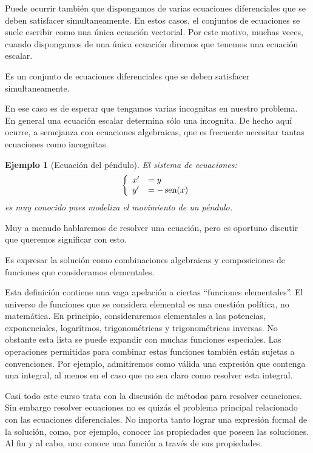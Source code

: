 \documentclass{article}
\renewcommand{\emph}[1]{\textcolor[rgb]{1,0,0}{#1}}
\DeclareMathOperator{\sen}{sen}
\newtheorem{ejemplo}{Ejemplo}}
\begin{document}
Puede ocurrir también que dispongamos de varias ecuaciones diferenciales que se deben satisfacer simultaneamente. En estos casos, el conjuntos de ecuaciones se suele escribir como una única ecuación vectorial. Por este motivo, muchas veces, cuando dispongamos de una única ecuación diremos que tenemos una \emph{ecuación  escalar}.

\begin{definicion} Es un  conjunto de ecuaciones diferenciales que se deben satisfacer simultaneamente.
 \end{definicion}

En ese caso es  de esperar que tengamos varias incognitas en
nuestro problema. En general una ecuación escalar determina sólo una incognita. De hecho aquí ocurre, a semejanza con ecuaciones algebraicas, que es frecuente necesitar tantas ecuaciones como incognitas.

\begin{ejemplo}[Ecuación del péndulo] El sistema de ecuaciones:
\[\left\{ \begin{array}{l l} x'&=y \\y'&=-\sen(x) \end{array}\right.\]
es muy conocido pues modeliza el movimiento de un péndulo.
\end{ejemplo}



Muy a menudo hablaremos de resolver una ecuación, pero es oportuno discutir que queremos significar con esto.

\begin{definicion} Es expresar la solución como combinaciones algebraicas y composiciones de funciones que consideramos elementales.
\end{definicion}

Esta definición contiene una vaga apelación a ciertas ``funciones elementales''. El universo de funciones que se considera elemental es una cuestión política, no matemática. En  principio, consideraremos elementales a las potencias, exponenciales, logarítmos, trigonométricas y trigonométricas inversas. No obstante esta lista se puede expandir con muchas funciones especiales.  Las operaciones permitidas para combinar estas funciones
también están sujetas a convenciones. Por ejemplo, admitiremos como válida una expresión que contenga una integral, al menos en el caso que no sea claro como resolver esta integral.

 Casi todo este curso trata con la discusión de métodos para resolver ecuaciones.  Sin embargo resolver ecuaciones no es quizás el problema principal relacionado con las ecuaciones diferenciales. No importa tanto lograr una expresión formal de la solución, como, por ejemplo, conocer las propiedades que poseen las soluciones. Al fin y al cabo, uno conoce una función a través de sus propiedades.
 
\end{document}

